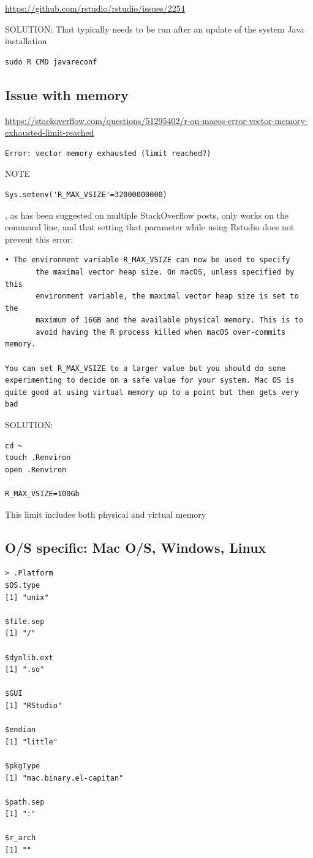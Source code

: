 \url{https://github.com/rstudio/rstudio/issues/2254}

SOLUTION: That typically needs to be run after an update of the system Java installation
\begin{verbatim}
sudo R CMD javareconf
\end{verbatim}

\subsection{Issue with memory}

\url{https://stackoverflow.com/questions/51295402/r-on-macos-error-vector-memory-exhausted-limit-reached}

\begin{verbatim}
Error: vector memory exhausted (limit reached?)
\end{verbatim}

NOTE
\begin{verbatim}
Sys.setenv('R_MAX_VSIZE'=32000000000)
\end{verbatim}
, as has been suggested on multiple StackOverflow posts, only works on the
command line, and that setting that parameter while using Rstudio does not
prevent this error:

\begin{verbatim}
• The environment variable R_MAX_VSIZE can now be used to specify 
       the maximal vector heap size. On macOS, unless specified by this 
       environment variable, the maximal vector heap size is set to the 
       maximum of 16GB and the available physical memory. This is to 
       avoid having the R process killed when macOS over-commits memory. 
       
You can set R_MAX_VSIZE to a larger value but you should do some 
experimenting to decide on a safe value for your system. Mac OS is 
quite good at using virtual memory up to a point but then gets very bad
\end{verbatim}

SOLUTION:
\begin{verbatim}
cd ~
touch .Renviron
open .Renviron

R_MAX_VSIZE=100Gb 
\end{verbatim}
This limit includes both physical and virtual memory
\subsection{O/S specific: Mac O/S, Windows, Linux}


\begin{verbatim}
> .Platform
$OS.type
[1] "unix"

$file.sep
[1] "/"

$dynlib.ext
[1] ".so"

$GUI
[1] "RStudio"

$endian
[1] "little"

$pkgType
[1] "mac.binary.el-capitan"

$path.sep
[1] ":"

$r_arch
[1] ""

\end{verbatim}

